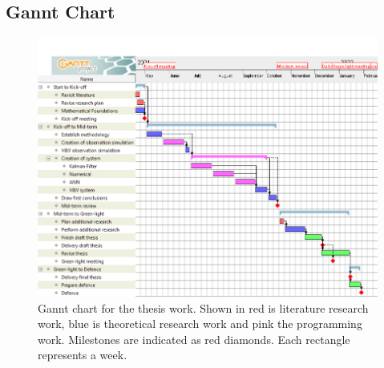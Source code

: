 \subsection{Gannt Chart}
\begin{figure}[h!]
    \centering
    \includegraphics[width=1.0\textwidth]{images/exportportrait.png}
    \caption{Gannt chart for the thesis work. Shown in red is literature research work, blue is theoretical research work and pink the programming work. Milestones are indicated as red diamonds. Each rectangle represents a week.}
    \label{fig:gannt}
\end{figure}